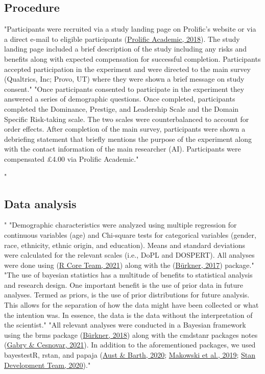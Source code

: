 \documentclass[
"  donotrepeattitle,doc, 12pt, a4paper,floatsintext]{apa7}"
\begin{document}
\hypertarget{procedure}{%
\subsection{Procedure}\label{procedure}}
"Participants were recruited via a study landing page on Prolific's website or via a direct e-mail to eligible participants (\protect\hyperlink{ref-prolificacademic2018}{Prolific Academic, 2018}). The study landing page included a brief description of the study including any risks and benefits along with expected compensation for successful completion. Participants accepted participation in the experiment and were directed to the main survey (Qualtrics, Inc; Provo, UT) where they were shown a brief message on study consent."
"Once participants consented to participate in the experiment they answered a series of demographic questions. Once completed, participants completed the Dominance, Prestige, and Leadership Scale and the Domain Specific Risk-taking scale. The two scales were counterbalanced to account for order effects. After completion of the main survey, participants were shown a debriefing statement that briefly mentions the purpose of the experiment along with the contact information of the main researcher (AI). Participants were compensated £4.00 via Prolific Academic."
\hypertarget{data-analysis}{%
"\subsection{Data analysis}\label{data-analysis}}"
"Demographic characteristics were analyzed using multiple regression for continuous variables (age) and Chi-square tests for categorical variables (gender, race, ethnicity, ethnic origin, and education). Means and standard deviations were calculated for the relevant scales (i.e., DoPL and DOSPERT). All analyses were done using (\protect\hyperlink{ref-rcoreteam2021}{R Core Team, 2021}) along with the (\protect\hyperlink{ref-burkner2017}{Bürkner, 2017}) package."
"The use of bayesian statistics has a multitude of benefits to statistical analysis and research design. One important benefit is the use of prior data in future analyses. Termed as priors, is the use of prior distributions for future analysis. This allows for the separation of how the data might have been collected or what the intention was. In essence, the data is the data without the interpretation of the scientist."
"All relevant analyses were conducted in a Bayesian framework using the brms package (\protect\hyperlink{ref-burkner2018}{Bürkner, 2018}) along with the cmdstanr packages notes (\protect\hyperlink{ref-gabry2021}{Gabry \& Cesnovar, 2021}). In addition to the aforementioned packages, we used bayestestR, rstan, and papaja (\protect\hyperlink{ref-aust2020}{Aust \& Barth, 2020}; \protect\hyperlink{ref-makowski2019}{Makowski et al., 2019}; \protect\hyperlink{ref-standevelopmentteam2020}{Stan Development Team, 2020})."
\end{document}
